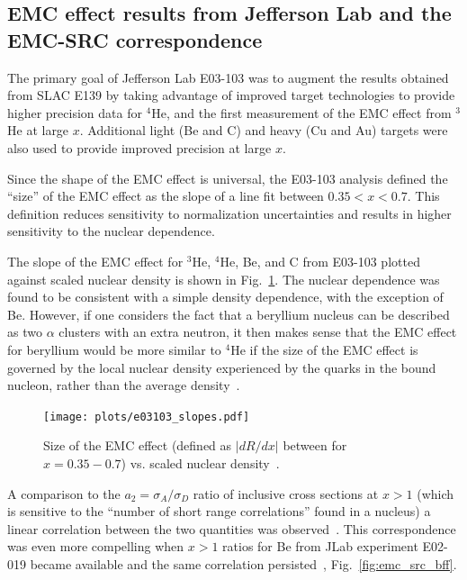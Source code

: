 \subsection{EMC effect results from Jefferson Lab and the EMC-SRC correspondence}

The primary goal of Jefferson Lab E03-103 was to augment the results obtained from SLAC E139 by taking
advantage of improved target technologies to provide higher precision data for $^4$He, and the first
measurement of the EMC effect from $^3$He at large $x$.  Additional light (Be and C) and heavy (Cu and Au)
targets were also used to provide improved precision at large $x$.

Since the shape of the EMC effect is universal, the E03-103 analysis defined the ``size'' of the EMC
effect as the slope of a line fit between $0.35<x<0.7$.  This definition reduces sensitivity to
normalization uncertainties and results in higher sensitivity to the nuclear dependence.

The slope of the EMC effect for $^3$He, $^4$He, Be, and C from E03-103 plotted against scaled nuclear
density is shown in Fig.~\ref{fig:emc_jlab_hallc}.  The nuclear dependence was found to be consistent
with a simple density dependence, with the exception of Be. However, if one considers the fact that a
beryllium nucleus can be described as two $\alpha$ clusters with an extra neutron, it then makes sense
that the EMC effect for beryllium would be more similar to $^4$He if the size of the EMC effect is
governed by the local nuclear density experienced by the quarks in the bound nucleon, rather than the
average density~\cite{Seely:2009gt}.

\begin{figure}[tbp]
  \centering\texttt{[image: plots/e03103\_slopes.pdf]}
  \caption{Size of the EMC effect (defined as $|dR/dx|$ between for $x=0.35-0.7$) vs. scaled nuclear
    density~\cite{Seely:2009gt}.}
  \label{fig:emc_jlab_hallc}
\end{figure}

A comparison to the $a_2=\sigma_A/\sigma_D$ ratio of
inclusive cross sections at $x>1$ (which is sensitive to the ``number of short range correlations''
found in a nucleus) a linear correlation between the two quantities was observed~\cite{Weinstein:2010rt}.
This correspondence was even more compelling when $x>1$ ratios for Be from JLab experiment E02-019 became
available and the same correlation persisted~\cite{Arrington:2012ax, Hen:2012fm}, Fig.~\ref{fig:emc_src_bff}.


